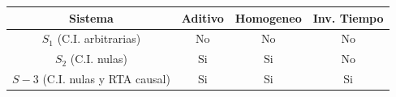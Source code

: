 \documentclass[12pt,a4paper]{report}
\begin{document}
\begin{enumerate}[label=\alph*)]

      \begin{table}[h]
        \centering
        \begin{tabular}{|c|c|c|c|}
          \hline
          \textbf{Sistema} & \textbf{Aditivo} & \textbf{Homogeneo} & \textbf{Inv. Tiempo}\\
          \hline
          $S_1$ (C.I. arbitrarias) & No & No & No\\
          \hline
          $S_2$ (C.I. nulas) & Si & Si & No\\
          \hline
          $S-3$ (C.I. nulas y RTA causal) & Si & Si & Si\\
          \hline
        \end{tabular}
      \end{table}


\end{enumerate}
\end{document}
